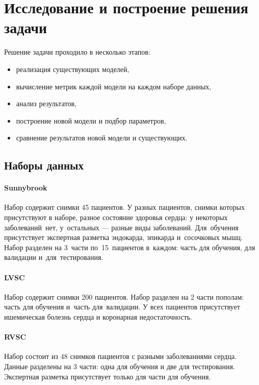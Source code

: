 \section{Исследование и построение решения задачи}

Решение задачи проходило в несколько этапов:

\begin{itemize}
  \item реализация существующих моделей,
  \item вычисление метрик каждой модели на каждом наборе данных,
  \item анализ результатов,
  \item построение новой модели и подбор параметров,
  \item сравнение результатов новой модели и существующих.
\end{itemize}

\subsection{Наборы данных}

\paragraph{Sunnybrook}

Набор содержит снимки 45 пациентов. У разных пациентов, 
снимки которых присутствуют в наборе, разное состояние здоровья сердца: 
у некоторых заболеваний~нет, у~остальных — разные виды заболеваний. 
Для~обучения присутствует экспертная разметка эндокарда, эпикарда 
и~сосочковых мышц. Набор разделен на 3~части по~15~пациентов 
в~каждом: часть для обучения, для валидации и~для~тестирования.

\paragraph{LVSC}

Набор содержит снимки 200 пациентов. Набор разделен на 2 части пополам: часть для обучения и~часть для~валидации. У всех пациентов присутствует ишемическая болезнь сердца и коронарная недостаточность.

\paragraph{RVSC}

Набор состоит из 48 снимков пациентов с разными заболеваниями сердца. Данные разделены на 3 части: одна для обучения и две для тестирования. Экспертная разметка присутствует только для части для обучения.

